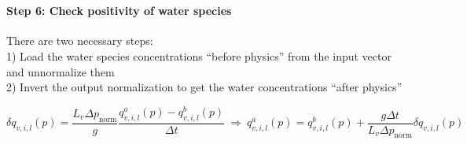 \documentclass[11pt]{article}
\begin{document}
    \begin{center}
    \end{center}
    { \hspace*{\fill} \\}
    
    \hypertarget{step-6-check-positivity-of-water-species}{%
\paragraph{Step 6: Check positivity of water
species}\label{step-6-check-positivity-of-water-species}}

There are two necessary steps:\\
1) Load the water species concentrations ``before physics'' from the
input vector and unnormalize them\\
2) Invert the output normalization to get the water concentrations
``after physics''

\[
\delta q_{v,i,l}\left(p\right)=\frac{L_{v}\Delta p_{\mathrm{norm}}}{g}\frac{q_{v,i,l}^{a}\left(p\right)-q_{v,i,l}^{b}\left(p\right)}{\Delta t}\ \Rightarrow\ q_{v,i,l}^{a}\left(p\right)=q_{v,i,l}^{b}\left(p\right)+\frac{g\Delta t}{L_{v}\Delta p_{\mathrm{norm}}}\delta q_{v,i,l}\left(p\right)
\]
\end{document}
